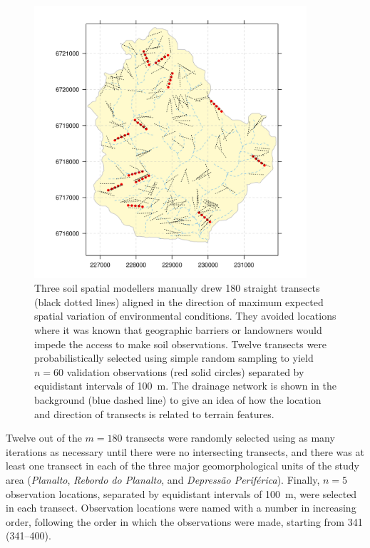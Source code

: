 \begin{figure}[!ht]
\centering
\includegraphics[width=0.90\textwidth]{fig/chap04-subset-II}
\caption[Twelve transects were selected using simple random sampling to yield $n = 60$ validation 
observations]{Three soil spatial modellers manually drew 180 straight transects (black dotted lines) aligned 
in the direction of maximum expected spatial variation of environmental conditions. They avoided locations 
where it was known that geographic barriers or landowners would impede the access to make soil observations. 
Twelve transects were probabilistically selected using simple random sampling to yield $n = 60$ validation 
observations (red solid circles) separated by equidistant intervals of \SI{100}{\metre}. The drainage network 
is shown in the background (blue dashed line) to give an idea of how the location and direction of transects 
is related to terrain features.}
\label{fig:chap04-subset-II}
\end{figure}

Twelve out of the $m = 180$ transects were randomly selected using as many iterations as necessary until 
there were no intersecting transects, and there was at least one transect in each of the three major 
geomorphological units of the study area (\textit{Planalto}, \textit{Rebordo do Planalto}, and 
\textit{Depressão Periférica}). Finally, $n = 5$ observation locations, separated by equidistant intervals of 
\SI{100}{\metre}, were selected in each transect. Observation locations were named with a number in increasing 
order, following the order in which the observations were made, starting from \num{341} (\num{341}--\num{400}).


